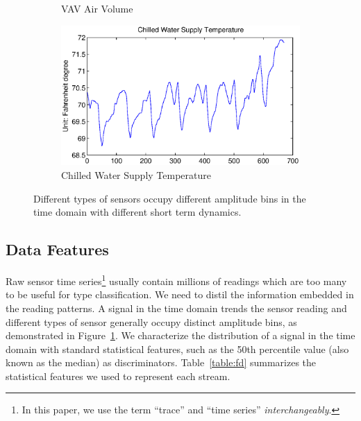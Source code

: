 \begin{figure}[ht!]
\begin{subfigure}{0.32\textwidth}
                \caption{VAV Air Volume}
  \end{subfigure}
  \begin{subfigure}{0.32\textwidth}
                \centering
    \includegraphics[width=\textwidth]{./fig/cwt.eps}
                \caption{Chilled Water Supply Temperature}
  \end{subfigure}
\caption{Different types of sensors occupy different amplitude bins in the time domain with different short term dynamics.}
\label{fig:example}
\end{figure}

\subsection{Data Features}
Raw sensor time series\footnote{In this paper, we use the term ``trace'' and ``time series'' \textit{interchangeably}.} usually contain millions of readings which are too many to be useful for type classification. We need to distil the information embedded in the reading patterns.
A signal in the time domain trends the sensor reading and different types of sensor generally occupy distinct amplitude bins, as demonstrated in Figure~\ref{fig:example}. 
We characterize the distribution of a signal in the time domain with standard statistical features, such as the 50th percentile value (also known as the median) as discriminators. 
Table~\ref{table:fd} summarizes the statistical features we used to represent each stream. 


